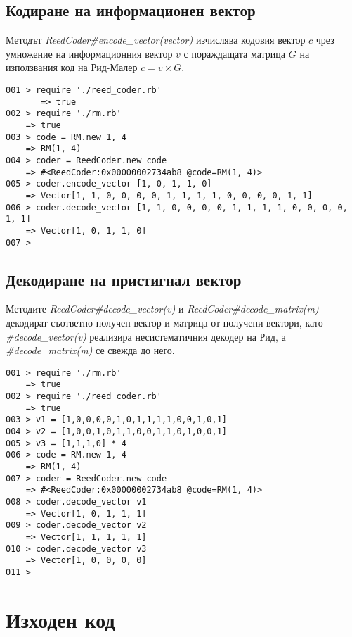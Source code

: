 \documentclass[a4paper,notitlepage,oneside]{report}
\begin{document}
\subsection{Кодиране на информационен вектор}
Методът \emph{ReedCoder\#encode\_vector(vector)} изчислява кодовия вектор $c$ чрез умножение на информационния вектор $v$  с пораждащата матрица $G$ на използвания код на Рид-Малер $c = v \times G$.

\begin{lstlisting}
001 > require './reed_coder.rb'
       => true 
002 > require './rm.rb'
    => true 
003 > code = RM.new 1, 4
    => RM(1, 4) 
004 > coder = ReedCoder.new code
    => #<ReedCoder:0x00000002734ab8 @code=RM(1, 4)> 
005 > coder.encode_vector [1, 0, 1, 1, 0]
    => Vector[1, 1, 0, 0, 0, 0, 1, 1, 1, 1, 0, 0, 0, 0, 1, 1] 
006 > coder.decode_vector [1, 1, 0, 0, 0, 0, 1, 1, 1, 1, 0, 0, 0, 0, 1, 1]
    => Vector[1, 0, 1, 1, 0] 
007 >
\end{lstlisting}

\subsection{Декодиране на пристигнал вектор}
Методите \emph{ReedCoder\#decode\_vector(v)} и \emph{ReedCoder\#decode\_matrix(m)} декодират съответно получен вектор и матрица от получени вектори, като \emph{\#decode\_vector(v)} реализира несистематичния декодер на Рид, а \emph{\#decode\_matrix(m)} се свежда до него.
\begin{lstlisting}
001 > require './rm.rb'
    => true 
002 > require './reed_coder.rb'
    => true 
003 > v1 = [1,0,0,0,0,1,0,1,1,1,1,0,0,1,0,1]
004 > v2 = [1,0,0,1,0,1,1,0,0,1,1,0,1,0,0,1]
005 > v3 = [1,1,1,0] * 4
006 > code = RM.new 1, 4
    => RM(1, 4) 
007 > coder = ReedCoder.new code
    => #<ReedCoder:0x00000002734ab8 @code=RM(1, 4)> 
008 > coder.decode_vector v1
    => Vector[1, 0, 1, 1, 1] 
009 > coder.decode_vector v2
    => Vector[1, 1, 1, 1, 1] 
010 > coder.decode_vector v3
    => Vector[1, 0, 0, 0, 0]
011 >
\end{lstlisting}

\section*{Изходен код}




\end{document}
